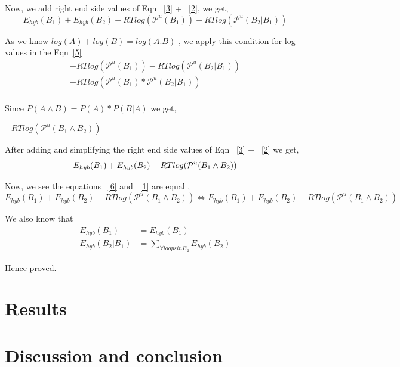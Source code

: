 \documentclass[twoside,a4paper]{report}
\begin{document}
Now, we add right end side values of Eqn ~\ref{3} + ~\ref{2}, we get,\\
	\begin{equation}
	\label{5}
	 E_{hyb}(B_1) + E_{hyb}(B_2) - RTlog(\mathcal{P}^u(B_1)) - RTlog(\mathcal{P}^u(B_2 | B_1))
	\end{equation}
	 
	As we know $log (A) + log (B) = log( A . B)$ , we apply this condition for log values in the Eqn~\ref{5}\\
	
	\begin{align*}
		-RTlog(\mathcal{P}^u(B_1)) - RTlog(\mathcal{P}^u(B_2 | B_1))\\
		-RTlog(\mathcal{P}^u(B_1) * \mathcal{P}^u(B_2 | B_1))\\
	\end{align*}
	
	Since $P(A \land B) = P(A) * P(B |A)$ we get,\\
	
	\begin{center}
		$-RTlog(\mathcal{P}^u(B_1 \land B_2))$
	\end{center}

 	After adding and simplifying the right end side values of Eqn ~\ref{3} + ~\ref{2} we get, \\
 	
 	\begin{equation}
 	\label{6}
 	E_{hyb}(B_1) + E_{hyb}(B_2) - RTlog(\mathcal{P}^u(B_1 \land B_2))\\
 	\end{equation}
	
	Now,  we see the equations ~\ref{6} and ~\ref{1} are equal ,\\
	\begin{equation}
	\label{7}
	E_{hyb}(B_1)+E_{hyb}(B_2)-RTlog(\mathcal{P}^u(B_1 \land B_2)) \Leftrightarrow E_{hyb}(B_1) + E_{hyb}(B_2) - RTlog(\mathcal{P}^u(B_1 \land B_2))
	\end{equation}
	
	We also know that \\
	\begin{align*}
		E_{hyb}(B_1) &= E_{hyb}(B_1)\\
		E_{hyb}( B_2 | B_1 ) &= \sum_{\forall loops in B_2}E_{hyb}(B_2)
	\end{align*}
	
	Hence proved. \\
	
	
	\chapter{Results}
	\chapter{Discussion and conclusion}
	
	
	
	

	
\end{document}
